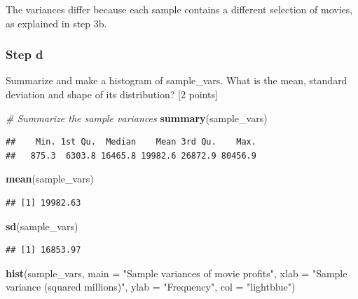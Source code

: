 \documentclass[
]{article}
\newenvironment{Shaded}{\begin{snugshade}}{\end{snugshade}}
\newcommand{\AttributeTok}[1]{\textcolor[rgb]{0.13,0.29,0.53}{#1}}
\newcommand{\CommentTok}[1]{\textcolor[rgb]{0.56,0.35,0.01}{\textit{#1}}}
\newcommand{\FunctionTok}[1]{\textcolor[rgb]{0.13,0.29,0.53}{\textbf{#1}}}
\newcommand{\NormalTok}[1]{#1}
\newcommand{\StringTok}[1]{\textcolor[rgb]{0.31,0.60,0.02}{#1}}
\begin{document}
The variances differ because each sample contains a different selection
of movies, as explained in step 3b.

\subsubsection{Step d}\label{step-d-1}

Summarize and make a histogram of sample\_vars. What is the mean,
standard deviation and shape of its distribution? {[}2 points{]}

\begin{Shaded}
\begin{Highlighting}[]
\CommentTok{\# Summarize the sample variances}
\FunctionTok{summary}\NormalTok{(sample\_vars)}
\end{Highlighting}
\end{Shaded}

\begin{verbatim}
##    Min. 1st Qu.  Median    Mean 3rd Qu.    Max. 
##   875.3  6303.8 16465.8 19982.6 26872.9 80456.9
\end{verbatim}

\begin{Shaded}
\begin{Highlighting}[]
\FunctionTok{mean}\NormalTok{(sample\_vars)}
\end{Highlighting}
\end{Shaded}

\begin{verbatim}
## [1] 19982.63
\end{verbatim}

\begin{Shaded}
\begin{Highlighting}[]
\FunctionTok{sd}\NormalTok{(sample\_vars)}
\end{Highlighting}
\end{Shaded}

\begin{verbatim}
## [1] 16853.97
\end{verbatim}

\begin{Shaded}
\begin{Highlighting}[]
\FunctionTok{hist}\NormalTok{(sample\_vars,}
     \AttributeTok{main =} \StringTok{"Sample variances of movie profits"}\NormalTok{,}
     \AttributeTok{xlab =} \StringTok{"Sample variance (squared millions)"}\NormalTok{,}
     \AttributeTok{ylab =} \StringTok{"Frequency"}\NormalTok{,}
     \AttributeTok{col =} \StringTok{"lightblue"}\NormalTok{)}
\end{Highlighting}
\end{Shaded}
\end{document}
